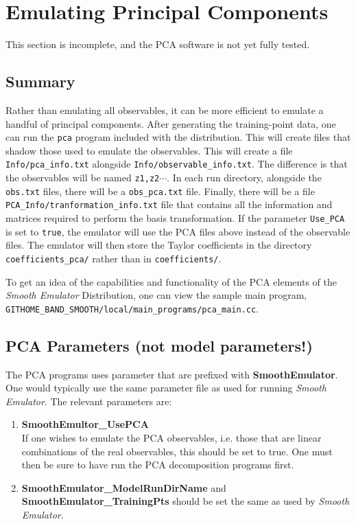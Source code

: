 \documentclass[UserManual.tex]{subfiles}
\begin{document}
\setcounter{section}{5}
\section{Emulating Principal Components}\label{sec:pca}

This section is incomplete, and the PCA software is not yet fully tested. 

\subsection{Summary}

Rather than emulating all observables, it can be more efficient to emulate a handful of principal components. After generating the training-point data, one can run the {\tt pca} program included with the distribution. This will create files that shadow those used to emulate the observables. This will create a file {\tt Info/pca\_info.txt} alongside {\tt Info/observable\_info.txt}. The difference is that the observables will be named {\tt z1,z2}$\cdots$. In each run directory, alongside the {\tt obs.txt} files, there will be a {\tt obs\_pca.txt} file. Finally, there will be a file {\tt PCA\_Info/tranformation\_info.txt} file that contains all the information and matrices required to perform the basis transformation. If the parameter {\tt Use\_PCA} is set to {\tt true}, the emulator will use the PCA files above instead of the observable files. The emulator will then store the Taylor coefficients in the directory {\tt coefficients\_pca/} rather than in {\tt coefficients/}. 

To get an idea of the capabilities and functionality of the PCA elements of the {\it Smooth Emulator} Distribution, one can view the sample main program,\\
{\tt GITHOME\_BAND\_SMOOTH/local/main\_programs/pca\_main.cc}. 

\subsection{PCA Parameters (not model parameters!)}
The PCA programs uses parameter that are prefixed with {\bf SmoothEmulator}. One would typically use the same parameter file as used for running {\it Smooth Emulator}. The relevant parameters are:
\begin{enumerate}\itemsep=0pt
\item {\bf SmoothEmultor\_UsePCA}\\
If one wishes to emulate the PCA observables, i.e. those that are linear combinations of the real observables, this should be set to true. One must then be sure to have run the PCA decomposition programs first. 
\item {\bf SmoothEmulator\_ModelRunDirName} and {\bf SmoothEmulator\_TrainingPts} should be set the same as used by {\it Smooth Emulator}.
\end{enumerate}
\end{document}
